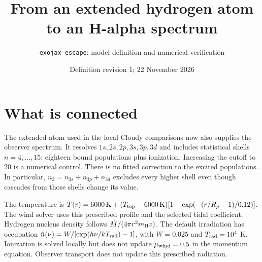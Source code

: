 \documentclass[10pt,a4paper]{article}
\title{From an extended hydrogen atom to an H-alpha spectrum}
\author{\texttt{exojax-escape}: model definition and numerical verification}
\date{Definition revision 1; 22 November 2026}
\begin{document}
\maketitle

\section{What is connected}
The extended atom used in the local Cloudy comparisons now also supplies the
observer spectrum. It resolves $1s,2s,2p,3s,3p,3d$ and includes statistical
shells $n=4,\ldots,15$: eighteen bound populations plus ionization. Increasing
the cutoff to 20 is a numerical control. There is no fitted correction to the
excited populations. In particular, $n_3=n_{3s}+n_{3p}+n_{3d}$ excludes every
higher shell even though cascades from those shells change its value.

\begin{center}
\end{center}

The temperature is
$T(r)=6000\,{\rm K}+(T_{\rm top}-6000\,{\rm K})
[1-\exp(-(r/R_p-1)/0.12)]$.
The wind solver uses this prescribed profile and the selected tidal coefficient.
Hydrogen nucleus density follows $\dot M/(4\pi r^2m_{\rm H}v)$.
The default irradiation has occupation
$\bar n(\nu)=W/[\exp(h\nu/kT_{\rm rad})-1]$, with
$W=0.025$ and $T_{\rm rad}=10^4$ K.
Ionization is solved locally but does not update $\mu_{\rm wind}=0.5$ in the
momentum equation. Observer transport does not update this prescribed radiation.
\end{document}
